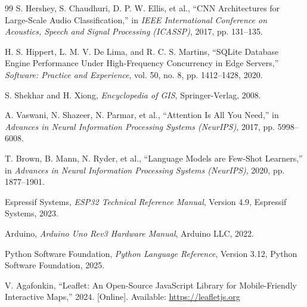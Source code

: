 \documentclass[11pt,a4paper,oneside]{report}
\begin{document}
\begin{thebibliography}{99}
S. Hershey, S. Chaudhuri, D. P. W. Ellis, et al., ``CNN Architectures for Large-Scale Audio Classification,'' in \textit{IEEE International Conference on Acoustics, Speech and Signal Processing (ICASSP)}, 2017, pp. 131--135.

H. S. Hippert, L. M. V. De Lima, and R. C. S. Martins, ``SQLite Database Engine Performance Under High-Frequency Concurrency in Edge Servers,'' \textit{Software: Practice and Experience}, vol. 50, no. 8, pp. 1412--1428, 2020.

S. Shekhar and H. Xiong, \textit{Encyclopedia of GIS}, Springer-Verlag, 2008.

A. Vaswani, N. Shazeer, N. Parmar, et al., ``Attention Is All You Need,'' in \textit{Advances in Neural Information Processing Systems (NeurIPS)}, 2017, pp. 5998--6008.

T. Brown, B. Mann, N. Ryder, et al., ``Language Models are Few-Shot Learners,'' in \textit{Advances in Neural Information Processing Systems (NeurIPS)}, 2020, pp. 1877--1901.

Espressif Systems, \textit{ESP32 Technical Reference Manual}, Version 4.9, Espressif Systems, 2023.

Arduino, \textit{Arduino Uno Rev3 Hardware Manual}, Arduino LLC, 2022.

Python Software Foundation, \textit{Python Language Reference}, Version 3.12, Python Software Foundation, 2025.

V. Agafonkin, ``Leaflet: An Open-Source JavaScript Library for Mobile-Friendly Interactive Maps,'' 2024. [Online]. Available: \url{https://leafletjs.org}
\end{thebibliography}
\end{document}

